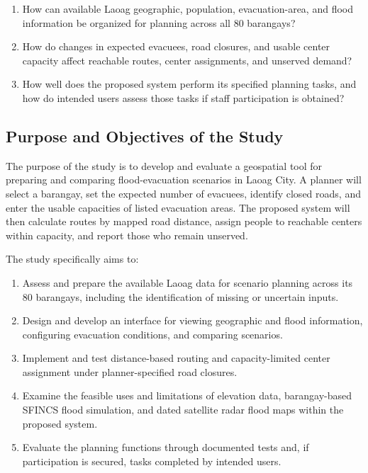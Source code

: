 \begin{enumerate}
  \item How can available Laoag geographic, population, evacuation-area, and flood information be organized for planning across all 80 barangays?
  \item How do changes in expected evacuees, road closures, and usable center capacity affect reachable routes, center assignments, and unserved demand?
  \item How well does the proposed system perform its specified planning tasks, and how do intended users assess those tasks if staff participation is obtained?
\end{enumerate}

\subsection{Purpose and Objectives of the Study}

The purpose of the study is to develop and evaluate a geospatial tool for preparing and comparing flood-evacuation scenarios in Laoag City. A planner will select a barangay, set the expected number of evacuees, identify closed roads, and enter the usable capacities of listed evacuation areas. The proposed system will then calculate routes by mapped road distance, assign people to reachable centers within capacity, and report those who remain unserved.

The study specifically aims to:

\begin{enumerate}
  \item Assess and prepare the available Laoag data for scenario planning across its 80 barangays, including the identification of missing or uncertain inputs.
  \item Design and develop an interface for viewing geographic and flood information, configuring evacuation conditions, and comparing scenarios.
  \item Implement and test distance-based routing and capacity-limited center assignment under planner-specified road closures.
  \item Examine the feasible uses and limitations of elevation data, barangay-based SFINCS flood simulation, and dated satellite radar flood maps within the proposed system.
  \item Evaluate the planning functions through documented tests and, if participation is secured, tasks completed by intended users.
\end{enumerate}

